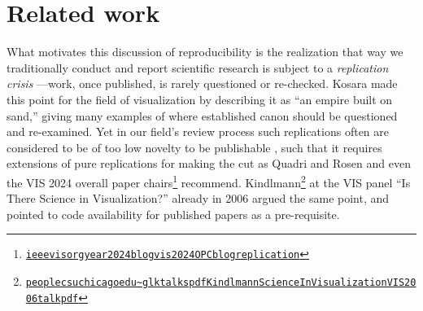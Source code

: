 \documentclass[conference,svgnames]{vgtc}                     %
\begin{document}
\section{Related work}
\label{sec:rw}

What motivates this discussion of reproducibility is the realization that way we traditionally conduct and report scientific research is subject to a \emph{replication crisis} \cite{Kosara:2018:SRC,Cockburn:2020:TRC}---work, once published, is rarely questioned or re-checked. Kosara \cite{Kosara:2016:EBS} made this point for the field of visualization by describing it as ``an empire built on sand,'' giving many examples of where established canon should be questioned and re-examined. Yet in our field's review process such replications often are considered to be of too low novelty to be publishable \cite{Quadri:2019:YCP}, such that it requires extensions of pure replications for making the cut as Quadri and Rosen \cite{Quadri:2019:YCP} and even the VIS 2024 overall paper chairs\footnote{\href{https://ieeevis.org/year/2024/blog/vis-2024-OPC-blog-replication}{\texttt{ieeevisorg\discretionary{/}{}{/}year\discretionary{/}{}{/}2024\discretionary{/}{}{/}blog\discretionary{/}{}{/}vis\discretionary{}{-}{-}2024\discretionary{}{-}{-}OPC\discretionary{}{-}{-}blog\discretionary{}{-}{-}replication}}} recommend. Kindlmann\footnote{\href{https://people.cs.uchicago.edu/~glk/talks/pdf/Kindlmann-ScienceInVisualization-VIS-2006-talk.pdf}{\texttt{peoplecsuchicagoedu\discretionary{/}{}{/}\~{}glk\discretionary{/}{}{/}talks\discretionary{/}{}{/}pdf\discretionary{/}{}{/}Kindlmann\discretionary{}{-}{-}ScienceInVisualization\discretionary{}{-}{-}VIS\discretionary{}{-}{-}2006\discretionary{}{-}{-}talkpdf}}} at the VIS panel ``Is There Science in Visualization?'' already in 2006 argued the same point, and pointed to code availability for published papers as a pre-requisite.
\end{document}
